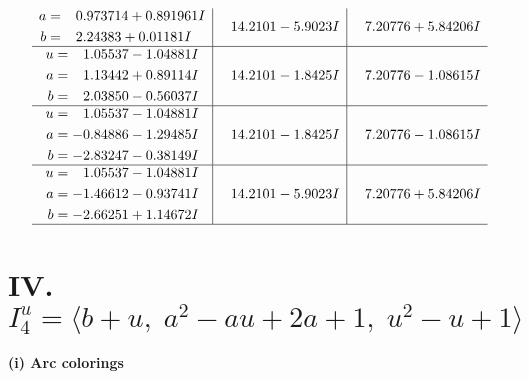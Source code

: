 \documentclass[1p]{elsarticle_modified}
\theoremstyle{definition}
\begin{document}
$$\begin{array}{c|c|c}
\begin{aligned}
a &= \phantom{-}0.973714 + 0.891961 I \\
b &= \phantom{-}2.24383 + 0.01181 I\end{aligned}
 & \phantom{-}14.2101 - 5.9023 I & \phantom{-}7.20776 + 5.84206 I \\ \hline\begin{aligned}
u &= \phantom{-}1.05537 - 1.04881 I \\
a &= \phantom{-}1.13442 + 0.89114 I \\
b &= \phantom{-}2.03850 - 0.56037 I\end{aligned}
 & \phantom{-}14.2101 - 1.8425 I & \phantom{-}7.20776 - 1.08615 I \\ \hline\begin{aligned}
u &= \phantom{-}1.05537 - 1.04881 I \\
a &= -0.84886 - 1.29485 I \\
b &= -2.83247 - 0.38149 I\end{aligned}
 & \phantom{-}14.2101 - 1.8425 I & \phantom{-}7.20776 - 1.08615 I \\ \hline\begin{aligned}
u &= \phantom{-}1.05537 - 1.04881 I \\
a &= -1.46612 - 0.93741 I \\
b &= -2.66251 + 1.14672 I\end{aligned}
 & \phantom{-}14.2101 - 5.9023 I & \phantom{-}7.20776 + 5.84206 I\\
 \hline 
 \end{array}$$\newpage\newpage\renewcommand{\arraystretch}{1}
\centering \section*{IV. $I^u_{4}= \langle b+u,\;a^2- a u+2 a+1,\;u^2- u+1 \rangle$}
\flushleft \textbf{(i) Arc colorings}\\
\end{document}
